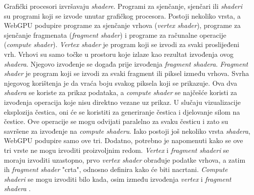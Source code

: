 \documentclass{foi}
\begin{document}
Grafički procesori izvršavaju \textit{shadere}. Programi za sjenčanje, sjenčari ili \textit{shaderi} su programi koji se izvode unutar grafičkog procesora. Postoji nekoliko vrsta, a WebGPU podupire programe za sjenčanje vrhova (\textit{vertex shader}), programe za sjenčanje fragmenata (\textit{fragment shader}) i programe za računalne operacije (\textit{compute shader}). \textit{Vertex shader} je program koji se izvodi za svaki proslijeđeni vrh. Vrhovi su samo točke u prostoru koje izlaze kao rezultat izvođenja ovog \textit{shadera}. Njegovo izvođenje se događa prije izvođenja \textit{fragment shadera}. \textit{Fragment shader} je program koji se izvodi za svaki fragment ili piksel između vrhova. Svrha njegovog korištenja je da vraća boju svakog piksela koji se prikazuje. Ova dva \textit{shadera} se koriste za prikaz podataka, a \textit{compute shader} se najčešće koristi za izvođenja operacija koje nisu direktno vezane uz prikaz. U slučaju vizualizacije eksplozija čestica, oni će se koristiti za generiranje čestica i djelovanje silom na čestice. Ove operacije se mogu odvijati paralelno za svaku česticu i zato su savršene za izvođenje na \textit{compute shaderu}. Iako postoji još nekoliko vrsta \textit{shadera}, WebGPU podupire samo ove tri. Dodatno, potrebno je napomenuti kako se ove tri vrste ne mogu izvoditi proizvoljnim redom. \textit{Vertex} i \textit{fragment shaderi} se moraju izvoditi uzastopno, prvo \textit{vertex shader} obrađuje podatke vrhova, a zatim ih \textit{fragment shader} "crta", odnosno definira kako će biti nacrtani. \textit{Compute shaderi} se mogu izvoditi bilo kada, osim između izvođenja \textit{vertex} i \textit{fragment shadera} \parencite{WebGPUFundamentalsFundamentals}.
\end{document}
